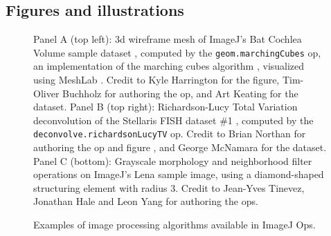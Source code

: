 \documentclass{bmcart}
\begin{document}
\begin{backmatter}




\section*{Figures and illustrations}
  \begin{figure}[h!]
    \caption{Examples of image processing algorithms available in ImageJ Ops.}
    \begin{flushleft}
      Panel A (top left): \acrshort{3d} wireframe mesh of ImageJ's Bat Cochlea
      Volume sample dataset \cite{bat_cochlea_volume}, computed by the
      \texttt{geom.marchingCubes} op, an implementation of the marching cubes
      algorithm \cite{marching_cubes}, visualized using MeshLab \cite{meshlab}.
      Credit to Kyle Harrington for the figure, Tim-Oliver Buchholz for
      authoring the op, and Art Keating for the dataset. Panel B (top right):
      Richardson-Lucy Total Variation deconvolution \cite{richardson_lucy} of
      the Stellaris FISH dataset \#1 \cite{stellaris_fish}, computed by the
      \texttt{deconvolve.richardsonLucyTV} op. Credit to Brian Northan for
      authoring the op and figure \cite{bnorthan_ops_decon}, and George
      McNamara for the dataset. Panel C (bottom): Grayscale morphology and
      neighborhood filter operations on ImageJ's Lena sample image, using a
      diamond-shaped structuring element with radius 3. Credit to Jean-Yves
      Tinevez, Jonathan Hale and Leon Yang for authoring the ops.
    \end{flushleft}
  \end{figure}


\end{backmatter}
\end{document}
